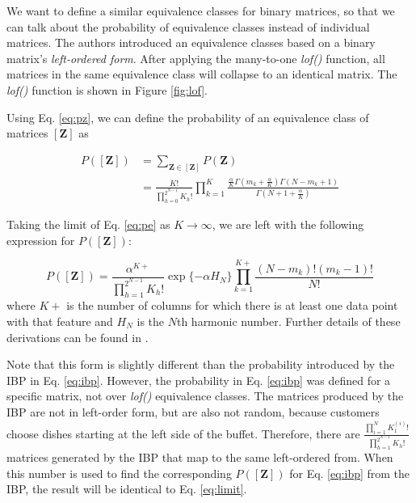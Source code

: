 \documentclass[twoside]{article}
\begin{document}
We want to define a similar equivalence classes for binary matrices, so that we can talk about the probability of equivalence classes instead of individual matrices. The authors introduced an equivalence classes based on a binary matrix's \textit{left-ordered form}. After applying the many-to-one \textit{lof()} function, all matrices in the same equivalence class will collapse to an identical matrix. The \textit{lof()} function is shown in Figure \ref{fig:lof}. 

Using Eq. \ref{eq:pz}, we can define the probability of an equivalence class of matrices $[\mathbf{Z}]$ as

\begin{equation}
\begin{split}
    P([\mathbf{Z}]) & = \sum_{\mathbf{Z} \in [\mathbf{Z}]} P(\mathbf{Z}) \\
    & = \frac{K!}{\prod_{h = 0}^{2^{N-1}}K_h!}\prod_{k=1}^K \frac{\frac{\alpha}{K} \Gamma(m_k + \frac{\alpha}{K}) \Gamma(N - m_k + 1)}{\Gamma(N + 1 + \frac{\alpha}{K})}
\end{split}
    \label{eq:pe}
\end{equation}

Taking the limit of Eq. \ref{eq:pe} as $K \to \infty$, we are left with the following expression for $P([\mathbf{Z}])$:

\begin{equation}
    P([\mathbf{Z}]) = \frac{\alpha^{K+}}{\prod_{h = 1}^{2^{N-1}}K_h!} \exp\{-\alpha H_N\} \prod_{k = 1}^{K+} \frac{(N-m_k)!(m_k-1)!}{N!}
    \label{eq:limit}
\end{equation}
where $K+$ is the number of columns for which there is at least one data point with that feature and $H_N$ is the $N$th harmonic number. Further details of these derivations can be found in \citet{Griffiths2011}.

Note that this form is slightly different than the probability introduced by the IBP in Eq. \ref{eq:ibp}. However, the probability in Eq. \ref{eq:ibp} was defined for a specific matrix, not over \textit{lof()} equivalence classes.  The matrices produced by the IBP are not in left-order form, but are also not random, because customers choose dishes starting at the left side of the buffet. Therefore, there are $\frac{\prod_{i=1}^N K_1^{(i)}!}{\prod_{h=1}^{2^{N-1}} K_h!}$ matrices generated by the IBP that map to the same left-ordered from. When this number is used to find the corresponding $P([\mathbf{Z}])$ for Eq. \ref{eq:ibp} from the IBP, the result will be identical to Eq. \ref{eq:limit}. 
\end{document}
